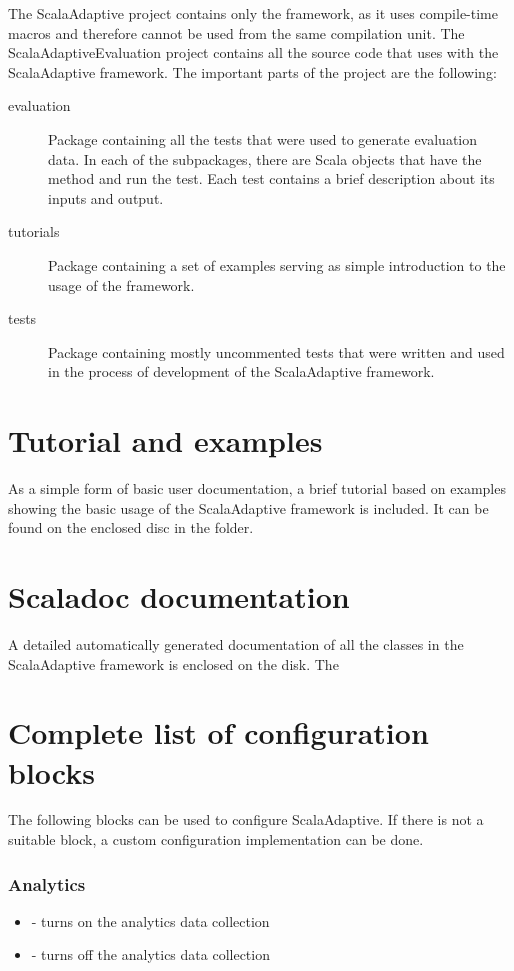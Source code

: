 \documentclass[12pt,a4paper]{report}
\begin{document}
The ScalaAdaptive project contains only the framework, as it uses compile-time macros and therefore cannot be used from the same compilation unit. The ScalaAdaptiveEvaluation project contains all the source code that uses with the ScalaAdaptive framework. The important parts of the project are the following:

\begin{description}
	\item [evaluation] Package containing all the tests that were used to generate evaluation data. In each of the subpackages, there are Scala objects that have the  method and run the test. Each test contains a brief description about its inputs and output.
	\item [tutorials] Package containing a set of examples serving as simple introduction to the usage of the framework.
	\item [tests] Package containing mostly uncommented tests that were written and used in the process of development of the ScalaAdaptive framework.
\end{description}

\section{Tutorial and examples}
\label{attach:tutorial}
As a simple form of basic user documentation, a brief tutorial based on examples showing the basic usage of the ScalaAdaptive framework is included. It can be found on the enclosed disc in the  folder.

\section{Scaladoc documentation}
\label{attach:scaladoc}

A detailed automatically generated documentation of all the classes in the ScalaAdaptive framework is enclosed on the disk. The 

\section{Complete list of configuration blocks}
\label{attach:config_blocks}

The following blocks can be used to configure ScalaAdaptive. If there is not a suitable block, a custom configuration implementation can be done.

\subsubsection{Analytics}
\begin{itemize}
	\item {} - turns on the analytics data collection
	\item {} - turns off the analytics data collection
\end{itemize}
\end{document}
